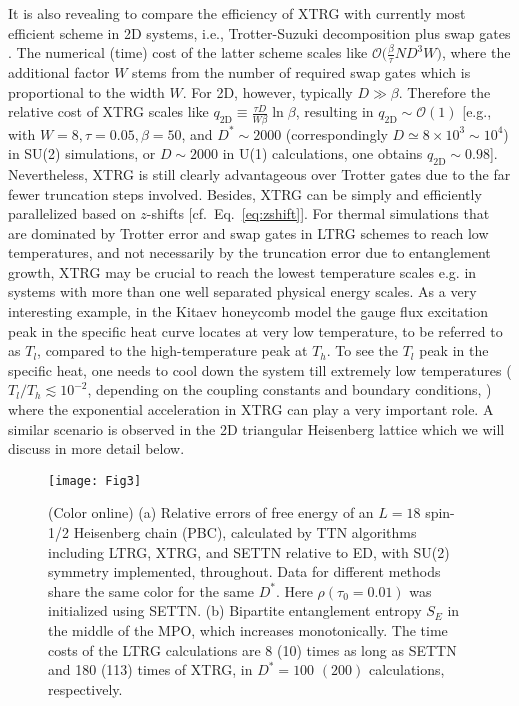 \documentclass[aps,prx,twocolumn,showpacs,psfig,superscriptaddress,longbibliography]{revtex4-1}
\newcommand{\order}[1]{\mathcal{O}{\left(#1\right)}}
\newcommand{\orderb}[1]{\mathcal{O}{\bigl(#1\bigr)}}
\newcommand{\Eq}[1]{Eq.~\eqref{#1}}
\def\Dstar{D^\ast}
\def\taui{\tau_0}
\begin{document}
It is also revealing to compare the efficiency of XTRG with
currently most efficient scheme in 2D systems, i.e., Trotter-Suzuki
decomposition plus swap gates \cite{Bruognolo.b+:2017:MPS}.  The
numerical (time) cost of the latter scheme scales like
$\orderb{\frac{\beta}{\tau} N D^3 W}$, where the additional factor
$W$ stems from the number of required swap gates which is
proportional to the width $W$.  For 2D, however, typically $D
\gg \beta$. Therefore the relative cost of XTRG scales like
$q_\mathrm{2D} \equiv \frac{\tau D}{W \beta} \ln{\beta}$,
resulting in $q_\mathrm{2D}\sim\order{1}$ [e.g., with
$W=8, \tau=0.05, \beta=50$, and $D^* \sim 2000$ (correspondingly
$D\simeq 8\times10^3 \sim 10^4$) in SU(2) simulations, or
$D\sim2000$ in U(1) calculations, one obtains $q_\mathrm{2D} \sim
0.98$].  Nevertheless, XTRG is still clearly advantageous over
Trotter gates due to the far fewer truncation steps involved.
Besides, XTRG can be simply and efficiently parallelized based on
$z$-shifts [cf.~\Eq{eq:zshift}].
%
For thermal simulations that are dominated by Trotter error and
swap gates in LTRG schemes to reach low temperatures, and not
necessarily by the truncation error due to entanglement growth, XTRG
may be crucial to reach the lowest temperature scales e.g. in
systems with more than one well separated physical energy scales.
As a very interesting example, in the Kitaev honeycomb model
the gauge flux excitation peak in the specific heat curve locates at
very low temperature, to be referred to as $T_l$,
compared to the high-temperature peak at $T_h$.
To see the $T_l$ peak in the specific heat, one needs to cool
down the system till extremely low temperatures ($T_l/T_h 
 {\lesssim 10^{-2}}$, 
depending on the coupling constants and boundary conditions,
\cite{Nasu2015:Kitaev}) 
where the exponential acceleration in XTRG can play a very
important role. A similar scenario is observed in the 2D triangular
Heisenberg lattice which we will discuss in more detail below.

\begin{figure}[tbp]
\texttt{[image: Fig3]}
\caption{(Color online)
   (a) Relative errors of free energy of an $L=18$ spin-1/2
   Heisenberg chain (PBC), calculated by TTN algorithms
   including LTRG,  XTRG, and SETTN relative to ED, with
   SU(2) symmetry implemented, throughout. Data for different
   methods share the same color for the same $\Dstar$.  Here
   $\rho(\taui=0.01)$ was initialized using SETTN.  (b)
   Bipartite entanglement entropy $S_E$ in the middle of the
   MPO, which increases  {monotonically}.  The time costs of the
   LTRG calculations are  8 (10) times as long as SETTN and
   180 (113) times of XTRG, in $\Dstar=100$ $(200)$
   calculations, respectively.
}
\label{Fig:FeErr}
\end{figure}
\end{document}
